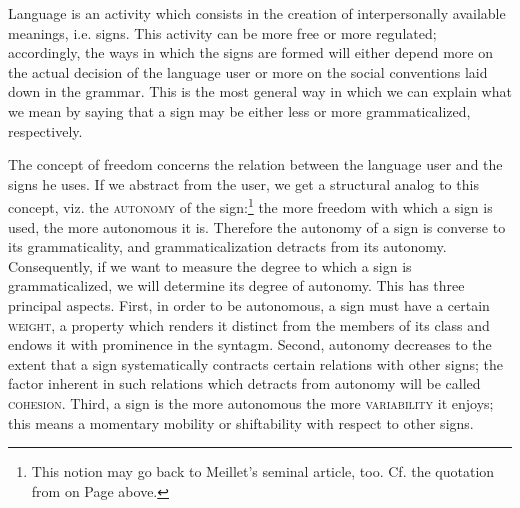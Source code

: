 Language is an activity which consists in the creation of interpersonally available meanings, i.e. signs. This activity can be more free or more regulated; accordingly, the ways in which the signs are formed will either depend more on the actual decision of the language user or more on the social conventions laid down in the grammar. This is the most general way in which we can explain what we mean by saying that a sign may be either less or more grammaticalized, respectively.

The concept of freedom concerns the relation between the language user and the signs he uses. If we abstract from the user, we get a structural analog to this concept, viz. the \textsc{autonomy} of the sign:\footnote{This notion may go back to Meillet's seminal article, too. Cf. the quotation from \citet[131]{Meillet1912} on Page \pageref{meillet} above.} the more freedom with which a sign is used, the more autonomous it is. Therefore the autonomy of a sign is converse to its grammaticality, and grammaticalization detracts from its autonomy. Consequently, if we want to measure the degree to which a sign is grammaticalized, we will determine its degree of autonomy. This has three principal aspects. First, in order to be autonomous, a sign must have a certain \textsc{weight}, a property which renders it distinct from the members of its class and endows it with prominence in the syntagm. Second, autonomy decreases to the extent that a sign systematically contracts certain relations with other signs; the factor inherent in such relations which detracts from autonomy will be called \textsc{cohesion}. Third, a sign is the more autonomous the more \textsc{variability} it enjoys; this means a momentary mobility or shiftability with respect to other signs.

